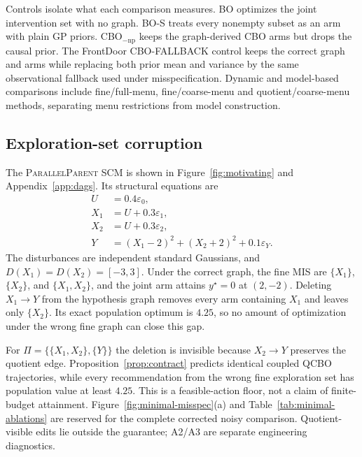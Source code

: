 \documentclass[twoside]{article}
\newcommand{\BO}{\textsc{BO}}
\newcommand{\BOS}{\textsc{BO-S}}
\newcommand{\CBONP}{\textsc{CBO}$_{\mathrm{-np}}$}
\begin{document}
Controls isolate what each comparison measures. \BO{} optimizes the joint intervention set with no graph. \BOS{} treats every nonempty subset as an arm with plain GP priors. \CBONP{} keeps the graph-derived CBO arms but drops the causal prior. The FrontDoor CBO-FALLBACK control keeps the correct graph and arms while replacing both prior mean and variance by the same observational fallback used under misspecification. Dynamic and model-based comparisons include fine/full-menu, fine/coarse-menu and quotient/coarse-menu methods, separating menu restrictions from model construction.

\subsection{Exploration-set corruption}
\label{sec:exp-a}

The \textsc{ParallelParent} SCM is shown in Figure~\ref{fig:motivating} and Appendix~\ref{app:dags}. Its structural equations are
\begin{equation}
 \begin{aligned}
 U&=0.4\varepsilon_0,\\ X_1&=U+0.3\varepsilon_1,\\
 X_2&=U+0.3\varepsilon_2,\\
 Y&=(X_1-2)^2+(X_2+2)^2
  +0.1\varepsilon_Y.
 \end{aligned}
 \label{eq:parallel-parent-scm}
\end{equation}
The disturbances are independent standard Gaussians, and $D(X_1)=D(X_2)=[-3,3]$.
Under the correct graph, the fine MIS are
$\{X_1\}$, $\{X_2\}$, and $\{X_1,X_2\}$, and the joint arm attains
$y^\star=0$ at $(2,-2)$. Deleting $X_1\to Y$ from the hypothesis graph removes every arm containing $X_1$ and leaves only $\{X_2\}$. Its exact population optimum is $4.25$, so no amount of optimization under the wrong fine graph can close this gap.

For $\Pi=\{\{X_1,X_2\},\{Y\}\}$ the deletion is invisible because $X_2\to Y$ preserves the quotient edge. Proposition~\ref{prop:contract} predicts identical coupled QCBO trajectories, while every recommendation from the wrong fine exploration set has population value at least $4.25$. This is a feasible-action floor, not a claim of finite-budget attainment. Figure~\ref{fig:minimal-misspec}(a) and Table~\ref{tab:minimal-ablations} are reserved for the complete corrected noisy comparison. Quotient-visible edits lie outside the guarantee; A2/A3 are separate engineering diagnostics.
\end{document}
